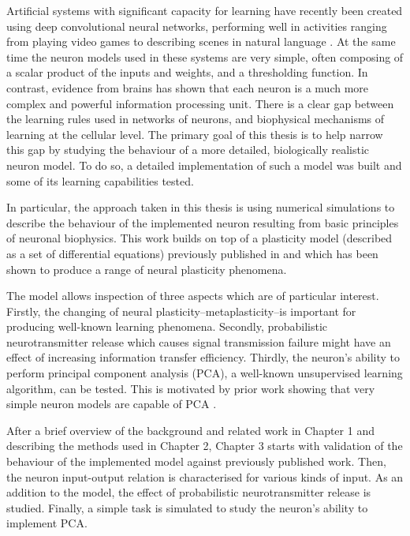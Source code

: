 \documentclass[a4paper,12pt]{report}
\theoremstyle{definition}
\begin{document}
Artificial systems with significant capacity for learning have recently been created using deep convolutional neural networks, performing well in activities ranging from playing video games \cite{mnih2015human} to describing scenes in natural language \cite{karpathy2014deep}. At the same time the neuron models used in these systems are very simple, often composing of a scalar product of the inputs and weights, and a thresholding function. In contrast, evidence from brains has shown that each neuron is a much more complex and powerful information processing unit. There is a clear gap between the learning rules used in networks of neurons, and biophysical mechanisms of learning at the cellular level. The primary goal of this thesis is to help narrow this gap by studying the behaviour of a more detailed, biologically realistic neuron model. To do so, a detailed implementation of such a model was built and some of its learning capabilities tested. 

In particular, the approach taken in this thesis is using numerical simulations to describe the behaviour of the implemented neuron resulting from basic principles of neuronal biophysics. This work builds on top of a plasticity model (described as a set of differential equations) previously published in \cite{yeung2004synaptic} and which has been shown to produce a range of neural plasticity phenomena. 

The model allows inspection of three aspects which are of particular interest. Firstly, the changing of neural plasticity--metaplasticity--is important for producing well-known learning phenomena. Secondly, probabilistic neurotransmitter release which causes signal transmission failure might have an effect of increasing information transfer efficiency. Thirdly, the neuron's ability to perform principal component analysis (PCA), a well-known unsupervised learning algorithm, can be tested. This is motivated by prior work showing that very simple neuron models are capable of PCA \cite{oja2008oja}.

After a brief overview of the background and related work in Chapter 1 and describing the methods used in Chapter 2, Chapter 3 starts with validation of the behaviour of the implemented model against previously published work. Then, the neuron input-output relation is characterised for various kinds of input. As an addition to the model, the effect of probabilistic neurotransmitter release is studied. Finally, a simple task is simulated to study the neuron's ability to implement PCA.
\end{document}
